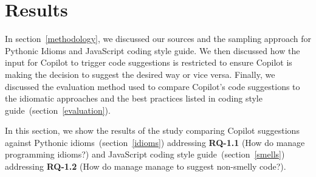 \section{Results}
\label{results}

In section~\ref{methodology}, we discussed our sources and the sampling approach for Pythonic Idioms and JavaScript coding style guide. 
We then discussed how the input for Copilot to trigger code suggestions is restricted to ensure Copilot is making the decision to suggest the desired way or vice versa.
Finally, we discussed the evaluation method used to compare Copilot's code suggestions to the idiomatic approaches and the best practices listed in coding style guide~(section~\ref{evaluation}).

In this section, we show the results of the study comparing Copilot suggestions against Pythonic idioms~(section~\ref{idioms}) addressing \textbf{RQ-1.1} (How do \cct{} manage programming idioms?) and JavaScript coding style guide~(section~\ref{smells}) addressing \textbf{RQ-1.2} (How do \cct{} manage manage to suggest non-smelly code?).




